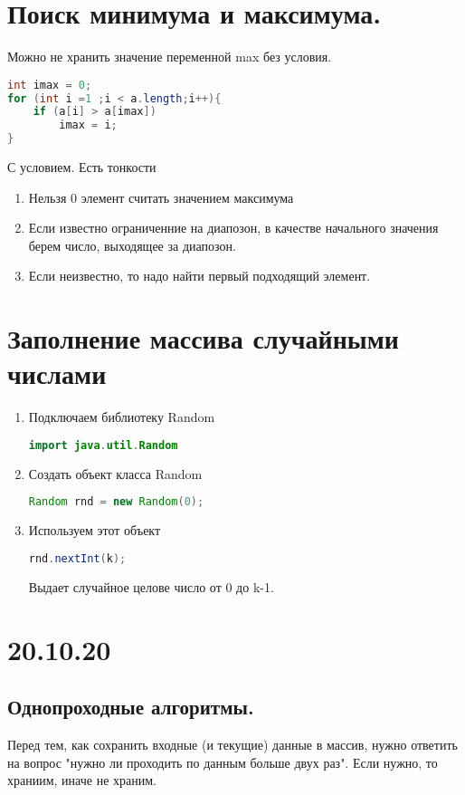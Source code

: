 \documentclass{scrartcl}
\begin{document}
\section{Поиск минимума и максимума.}
Можно не хранить значение переменной max без условия.
\begin{lstlisting}[language=Java] 
int imax = 0;
for (int i =1 ;i < a.length;i++){
    if (a[i] > a[imax])
        imax = i;
}
\end{lstlisting} 
С условием. Есть тонкости
\begin{enumerate}
    \item Нельзя 0 элемент считать значением максимума
    \item Если известно ограниченние на диапозон, в качестве начального значения берем число,
        выходящее за диапозон.
    \item Если неизвестно, то надо найти первый подходящий элемент.
\end{enumerate}
\section{Заполнение массива случайными числами}
\begin{enumerate}
    \item Подключаем библиотеку Random
        \begin{lstlisting}[language=Java] 
import java.util.Random 
        \end{lstlisting} 
        \item Создать объект класса Random
\begin{lstlisting}[language=Java] 
Random rnd = new Random(0);
\end{lstlisting} 
\item Используем этот объект
\begin{lstlisting}[language=Java] 
rnd.nextInt(k); 
\end{lstlisting} 
Выдает случайное целове число от 0 до k-1.
\end{enumerate}
\section{20.10.20}
\subsection{Однопроходные алгоритмы.}
Перед тем, как сохранить входные (и текущие) данные в массив, нужно ответить на вопрос "нужно ли проходить по данным больше двух раз". Если нужно, то храниим, иначе не храним.
\end{document}

